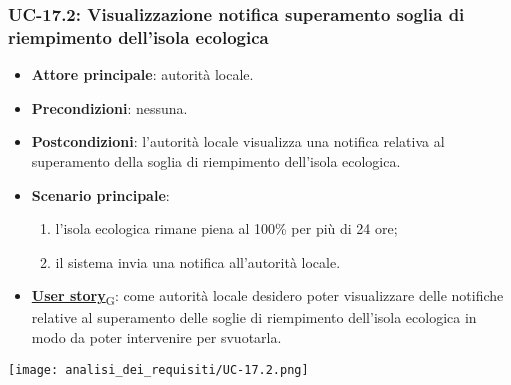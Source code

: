 \subsubsection{UC-17.2: Visualizzazione notifica superamento soglia di riempimento dell'isola ecologica}
\begin{itemize}
	\item \textbf{Attore principale}: autorità locale.
	\item \textbf{Precondizioni}: nessuna.
	\item \textbf{Postcondizioni}: l'autorità locale visualizza una notifica relativa al superamento della soglia di riempimento dell'isola ecologica.
	\item \textbf{Scenario principale}:
	      \begin{enumerate}
		      \item l'isola ecologica rimane piena al 100\% per più di 24 ore;
		      \item il sistema invia una notifica all'autorità locale.
	      \end{enumerate}
	\item \href{https://7last.github.io/docs/pb/documentazione-interna/glossario\#user-story}{\textbf{User story}\textsubscript{G}}:
	      come autorità locale desidero poter visualizzare delle notifiche relative al superamento delle soglie di riempimento dell'isola ecologica
	      in modo da poter intervenire per svuotarla.
\end{itemize}
\begin{center}
	\texttt{[image: analisi\_dei\_requisiti/UC-17.2.png]}
\end{center}

\newpage
